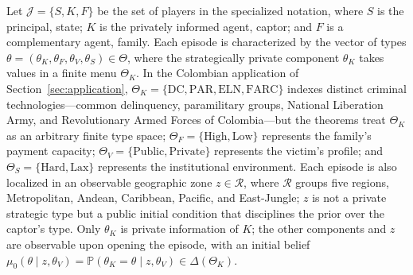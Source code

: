 \documentclass[review,authoryear,12pt]{elsarticle}
\theoremstyle{plain}
\theoremstyle{definition}
\newcommand{\Prob}{\mathbb{P}}
\newcommand{\ThetaK}{\Theta_K}
\newcommand{\1}{\mathbf{1}}
\begin{document}
Let $\mathcal{J}=\{S,K,F\}$ be the set of players in the specialized notation, where $S$ is the principal, state; $K$ is the privately informed agent, captor; and $F$ is a complementary agent, family. Each episode is characterized by the vector of types $\theta=(\theta_K,\theta_F,\theta_V,\theta_S)\in\Theta$, where the strategically private component $\theta_K$ takes values in a finite menu $\ThetaK$. In the Colombian application of Section~\ref{sec:application}, $\ThetaK=\{\text{DC},\text{PAR},\text{ELN},\text{FARC}\}$ indexes distinct criminal technologies---common delinquency, paramilitary groups, National Liberation Army, and Revolutionary Armed Forces of Colombia---but the theorems treat $\ThetaK$ as an arbitrary finite type space; $\Theta_F=\{\text{High},\text{Low}\}$ represents the family's payment capacity; $\Theta_V=\{\text{Public},\text{Private}\}$ represents the victim's profile; and $\Theta_S=\{\text{Hard},\text{Lax}\}$ represents the institutional environment. Each episode is also localized in an observable geographic zone $z\in\mathcal{R}$, where $\mathcal{R}$ groups five regions, Metropolitan, Andean, Caribbean, Pacific, and East-Jungle; $z$ is not a private strategic type but a public initial condition that disciplines the prior over the captor's type. Only $\theta_K$ is private information of $K$; the other components and $z$ are observable upon opening the episode, with an initial belief $\mu_0(\theta\mid z,\theta_V)=\Prob(\theta_K=\theta\mid z,\theta_V)\in\Delta(\ThetaK)$.
\end{document}
